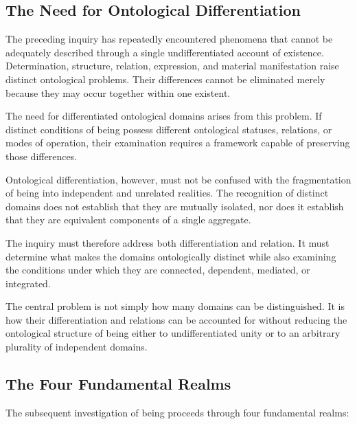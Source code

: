 
\subsection{The Need for Ontological Differentiation}

The preceding inquiry has repeatedly encountered
phenomena that cannot be adequately described through
a single undifferentiated account of existence.
Determination, structure, relation, expression,
and material manifestation raise distinct ontological
problems. Their differences cannot be eliminated
merely because they may occur together within one
existent.

The need for differentiated ontological domains
arises from this problem. If distinct conditions of
being possess different ontological statuses, relations,
or modes of operation, their examination requires
a framework capable of preserving those differences.

Ontological differentiation, however, must not be
confused with the fragmentation of being into
independent and unrelated realities. The recognition
of distinct domains does not establish that they
are mutually isolated, nor does it establish that
they are equivalent components of a single aggregate.

The inquiry must therefore address both differentiation
and relation. It must determine what makes the
domains ontologically distinct while also examining
the conditions under which they are connected,
dependent, mediated, or integrated.

The central problem is not simply how many domains
can be distinguished. It is how their differentiation
and relations can be accounted for without reducing
the ontological structure of being either to
undifferentiated unity or to an arbitrary plurality
of independent domains.


\subsection{The Four Fundamental Realms}

The subsequent investigation of being proceeds through
four fundamental realms:

